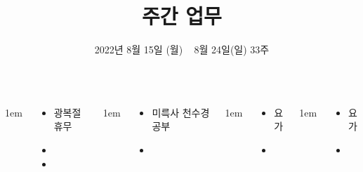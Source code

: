 \documentclass[	20pt, 
							a1paper, 
							portrait, %
							margin=0mm, %
							innermargin=10mm,  		%
							blockverticalspace=4mm, %
							colspace=5mm, 
							subcolspace=0mm
							]{tikzposter}
\title{주간 업무}
\author{ 2022년 8월 15일 (월) ~ 8월 24일(일) 33주 }
\begin{document}
	\maketitle

	\begin{columns}


			{
					\setlength{\leftmargini}{4em}
					\setlength{\labelsep} {1em}
				\begin{LARGE}
					\begin{itemize}
					\item 광복절 휴무
					\item 
					\item 
					\end{itemize}
				\end{LARGE}
			}

			{
					\setlength{\leftmargini}{4em}
					\setlength{\labelsep} {1em}
				\begin{LARGE}
					\begin{itemize}
					\item 미륵사 천수경 공부
					\item 

					\end{itemize}
				\end{LARGE}
			}


			{
					\setlength{\leftmargini}{4em}
					\setlength{\labelsep} {1em}
				\begin{LARGE}
					\begin{itemize}
					\item 요가
					\item 
					\end{itemize}
				\end{LARGE}
			}



			{
					\setlength{\leftmargini}{4em}
					\setlength{\labelsep} {1em}
				\begin{LARGE}
					\begin{itemize}
					\item 요가
					\item 
					\end{itemize}
				\end{LARGE}
			}


\end{columns}
\end{document}
